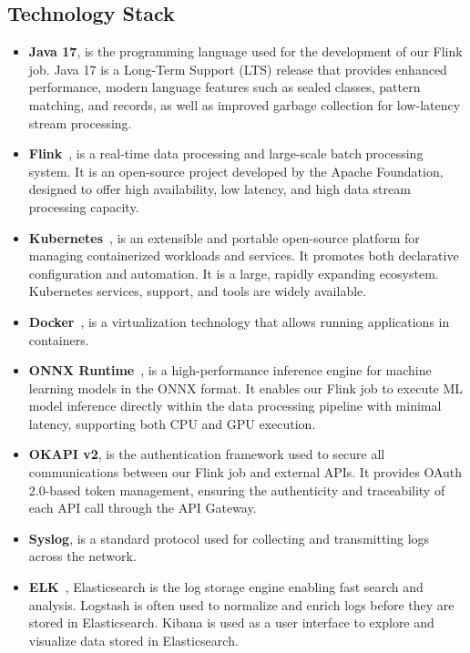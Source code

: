\subsection{Technology Stack}

\begin{itemize}
    \item[-] \textbf{Java 17}, is the programming language used for the development of our Flink job. Java 17 is a Long-Term Support (LTS) release that provides enhanced performance, modern language features such as sealed classes, pattern matching, and records, as well as improved garbage collection for low-latency stream processing.
    \item[-] \textbf{Flink}~\cite{FLINK}, is a real-time data processing and large-scale batch processing system. It is an open-source project developed by the Apache Foundation, designed to offer high availability, low latency, and high data stream processing capacity.
    \item[-] \textbf{Kubernetes}~\cite{K8S}, is an extensible and portable open-source platform for managing containerized workloads and services. It promotes both declarative configuration and automation. It is a large, rapidly expanding ecosystem. Kubernetes services, support, and tools are widely available.
    \item[-] \textbf{Docker}~\cite{docker}, is a virtualization technology that allows running applications in containers.
    \item[-] \textbf{ONNX Runtime}~\cite{onnxruntime}, is a high-performance inference engine for machine learning models in the ONNX format. It enables our Flink job to execute ML model inference directly within the data processing pipeline with minimal latency, supporting both CPU and GPU execution.
    \item[-] \textbf{OKAPI v2}, is the authentication framework used to secure all communications between our Flink job and external APIs. It provides OAuth 2.0-based token management, ensuring the authenticity and traceability of each API call through the API Gateway.
    \item[-] \textbf{Syslog}, is a standard protocol used for collecting and transmitting logs across the network.
    \item[-] \textbf{ELK}~\cite{elk}, Elasticsearch is the log storage engine enabling fast search and analysis. Logstash is often used to normalize and enrich logs before they are stored in Elasticsearch. Kibana is used as a user interface to explore and visualize data stored in Elasticsearch.

\end{itemize}
